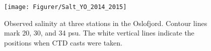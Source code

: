 \begin{figure}[htb]
	\centerline{
		\texttt{[image: Figurer/Salt\_YO\_2014\_2015]} }
	\caption{\small Observed salinity at three stations in the Oslofjord. Contour lines mark 20, 30, and 34 psu. The white vertical lines indicate the positions when CTD casts were taken.}
	\label{fig:Salt_YO_2014_2015}
\end{figure}

